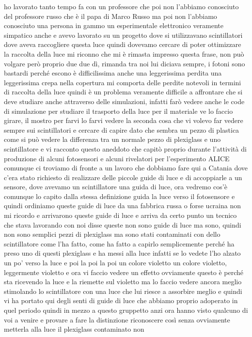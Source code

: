 {ho lavorato tanto tempo fa con un professore che poi non l'abbiamo conosciuto del professore russo che è il papa di Marco Russo ma poi non l'abbiamo conosciuto una persona in gammo un esperimentale elettronico veramente simpatico anche e avevo lavorato su un progetto dove si utilizzavano scintillatori dove aveva raccogliere questa luce quindi dovevamo cercare di poter ottimizzare la raccolta della luce mi riconno che mi è rimasta impresso questa frase, non può volgare però proprio due due dì, rimanda tra noi lui diciava sempre, i fotoni sono bastardi perché escono è difficilissima anche una leggerissima perdita una leggerissima crepa nella copertura mi comporta delle perdite notevoli in termini di raccolta della luce quindi è un problema veramente difficile a affrontare che si deve studiare anche attraverso delle simulazioni, infatti farò vedere anche le code di simulazione per studiare il trasporto della luce per il materiale ve lo faccio girare, il mostro per farvi lo farvi vedere la seconda cosa che vi volevo far vedere sempre sui scintillatori e cercare di capire dato che sembra un pezzo di plastica come si può vedere la differenza tra un normale pezzo di plexiglass e uno scintillatore e vi racconto questo aneddoto che capitò proprio durante l'attività di produzione di alcuni fotosensori e alcuni rivelatori per l'esperimento ALICE comunque ci troviamo di fronte a un lavoro che dobbiamo fare qui a Catania dove c'era stato richiesto di realizzare delle piccole guide di luce e di accoppiarle a un sensore, dove avevamo un scintillatore una guida di luce, ora vedremo cos'è comunque lo capito dalla stessa definizione guida la luce verso il fotosensore e quindi ordiniamo queste guide di luce da una fabbrica russa o forse ucraina non mi ricordo e arrivarono queste guide di luce e arriva da certo punto un tecnico che stava lavorando con noi disse queste non sono guide di luce ma sono, quindi non sono semplici pezzi di plexiglass ma sono stati contaminati con dello scintillatore come l'ha fatto, come ha fatto a capirlo semplicemente perché ha preso uno di questi plexiglass e ha messi alla luce infatti se lo vedete l'ho alzato un po' verso la luce e poi la poi la poi un colore violetto un colore violetto, leggermente violetto e ora vi faccio vedere un effetto ovviamente questo è perché sta ricevendo la luce e la riemette sul violetto ma lo faccio vedere ancora meglio stimolando lo scintillatore con una luce che lui riesce a assorbire meglio e quindi vi ha portato qui degli senti di guide di luce che abbiamo proprio adoperato in quel periodo quindi in mezzo a questo gruppetto anzi ora hanno visto qualcuno di voi a venire e provare a fare la distinzione riconoscere così senza ovviamente metterla alla luce il plexiglass contaminato non

}

